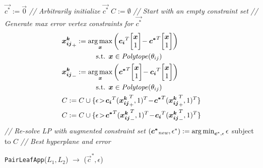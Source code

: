 \incmargin{1.5em}
\linesnumbered
\begin{algorithm}[t!]
\dontprintsemicolon
$\vec{c^*} := \vec{0}$ \emph{// Arbitrarily initialize $\vec{c^*}$}\;
$C := \emptyset$ \emph{// Start with an empty constraint set}\;
\emph{// Generate max error vertex constraints for $\vec{c^*}$}\;
 {
\nlset{} \vspace{-7mm}
\begin{align*}
&\vec{x_{ij}^k}_+ := \argmax_{\vec{x}} \left( \vec{c_i}^T \! \mb \vec{x}\\1 \me \! - \vec{c^*}^T \! \mb \vec{x}\\1 \me \right) \\ 
&  \hspace{17mm} \textrm{s.t. } \vec{x} \in \PT(\theta_{ij})\\
&\vec{x_{ij}^k}_- := \argmax_{\vec{x}} \left( \vec{c^*}^T \! \mb \vec{x}\\1 \me \! - \vec{c_i}^T \! \mb \vec{x}\\1 \me \right) \\ 
&  \hspace{17mm} \textrm{s.t. } \vec{x} \in \PT(\theta_{ij})\\
&  C := C \cup \{ \epsilon \!>\! \vec{c_i}^T (\vec{x_{ij}^k}_+^T,1)^T \!-\! \vec{c^*}^T (\vec{x_{ij}^k}_+^T,1)^T \} \\
&  C := C \cup \{ \epsilon \!>\! \vec{c^*}^T (\vec{x_{ij}^k}_-^T,1)^T \!-\! \vec{c_i}^T (\vec{x_{ij}^k}_-^T,1)^T \}
\end{align*}\vspace{-5mm}
}
\emph{// Re-solve LP with augmented constraint set}\;
$(\vec{c^*}_{\mathit{new}},\epsilon^*) := \argmin_{\vec{c}^*,\epsilon} \epsilon$ subject to $C$\;
\emph{// Best hyperplane and error}\;
\caption{\footnotesize 
 \texttt{PairLeafApp}($L_1,L_2$) $\longrightarrow$ ($\vec{c}^*,\epsilon$)}
\label{alg:pairleafapp}
\end{algorithm}
\decmargin{1.5em}

